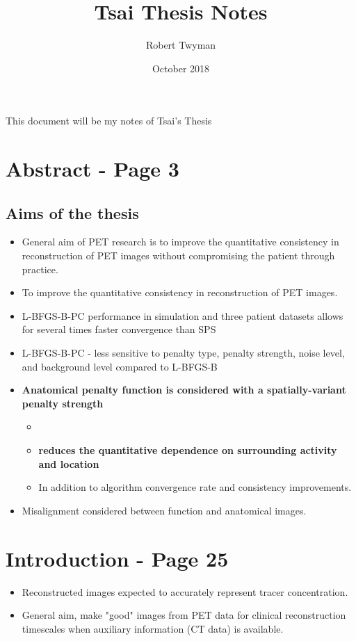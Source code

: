 \documentclass{article}
\title{Tsai Thesis Notes}
\author{Robert Twyman}
\date{October 2018}
\begin{document}
\maketitle

This document will be my notes of Tsai's Thesis \cite{Tsai2018TsaiEfc.pdf}

\section{Abstract - Page 3}
\subsection{Aims of the thesis}
\begin{itemize}
\item General aim of PET research is to improve the quantitative consistency in reconstruction of PET images without compromising the patient through practice.
\item To improve the quantitative consistency in reconstruction of PET images.
\item L-BFGS-B-PC performance in simulation and three patient datasets allows for several times faster convergence than SPS
\item L-BFGS-B-PC - less sensitive to penalty type, penalty strength, noise level, and background level compared to L-BFGS-B
\item \textbf{Anatomical penalty function is considered with a spatially-variant penalty strength}
\begin{itemize}
\item \color{red}{a function which varies over space (based on CT?)}
\item \textbf{reduces the quantitative dependence on surrounding activity and location}
\item In addition to algorithm convergence rate and consistency improvements.
\end{itemize}
\item Misalignment considered between function and anatomical images.
\end{itemize}
\section{Introduction - Page 25}
\begin{itemize}
\item Reconstructed images expected to accurately represent tracer concentration.
\item General aim, make "good" images from PET data for clinical reconstruction timescales when auxiliary information (CT data) is available.
\end{itemize}
\end{document}
